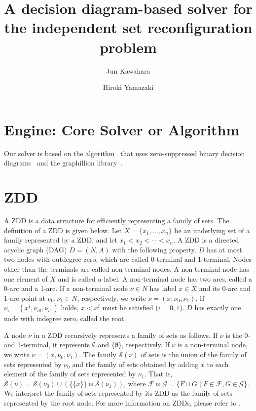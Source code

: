 \documentclass{article}
\date{}
\title{A decision diagram-based solver for the independent set reconfiguration problem}
\author[1]{Jun Kawahara}
\author[1]{Hiroki Yamazaki}
\affil[1]{Kyoto University}
\begin{document}
\maketitle

\section{Engine: Core Solver or Algorithm}
Our solver is based on the algorithm~\cite{Ito2022} that uses
zero-suppressed binary decision diagrams~\cite{Minato93} and the graphillion library~\cite{Inoue2016}.

\section{ZDD}

A ZDD is a data structure for efficiently representing a family of sets.
The definition of a ZDD is given below.
Let $X = \{x_1, \ldots,x_n\}$ be an underlying set of a family represented by a ZDD,
and let $x_1 < x_2 < \cdots < x_n$.
A ZDD is a directed acyclic graph (DAG) $D = (N, A)$ with the following property.
$D$ has at most two nodes with outdegree zero, which are called 0-terminal and 1-terminal.
Nodes other than the terminals are called non-terminal nodes. A non-terminal node has one element of $X$ and is called a label.
A non-terminal node has two arcs, called a 0-arc and a 1-arc.
If a non-terminal node $\nu \in N$ has label $x \in X$ and its 0-arc and 1-arc point at $\nu_0, \nu_1 \in N$, respectively,
we write $\nu = (x, \nu_0, \nu_1)$.
If $\nu_i = (x^i, \nu_{i0}, \nu_{i1})$ holds, $x < x^i$ must be satisfied ($i = 0, 1$).
$D$ has exactly one node with indegree zero, called the root.

A node $\nu$ in a ZDD recursively represents a family of sets as follows.
If $\nu$ is the 0- and 1-terminal, it represents $\emptyset$ and $\{\emptyset\}$, respectively.
If $\nu$ is a non-terminal node, we write $\nu = (x, \nu_0, \nu_1)$.
The family $\mathcal{S}(\nu)$ of sets is the union of the family of sets represented by $\nu_0$
and the family of sets obtained by adding $x$ to each element of the family of sets represented by $\nu_1$.
That is, $\mathcal{S}(\nu) = \mathcal{S}(\nu_0) \cup (\{\{x\}\} \Join \mathcal{S}(\nu_1))$,
where $\mathcal{F} \Join \mathcal{G} = \{F \cup G \mid F \in \mathcal{F},
G \in \mathcal{G} \}$.
We interpret the family of sets represented by its ZDD as the family of sets represented by the root node.
For more information on ZDDs, please refer to \cite{Knuth2011}.
\end{document}
